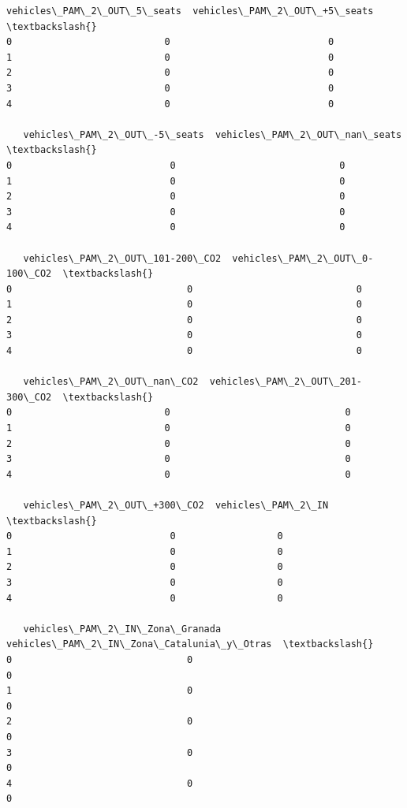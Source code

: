 \documentclass[11pt]{article}
\begin{document}
\begin{tcolorbox}[breakable, size=fbox, boxrule=.5pt, pad at break*=1mm, opacityfill=0]
\begin{Verbatim}[commandchars=\\\{\}]
   vehicles\_PAM\_2\_OUT\_5\_seats  vehicles\_PAM\_2\_OUT\_+5\_seats  \textbackslash{}
0                           0                            0
1                           0                            0
2                           0                            0
3                           0                            0
4                           0                            0

   vehicles\_PAM\_2\_OUT\_-5\_seats  vehicles\_PAM\_2\_OUT\_nan\_seats  \textbackslash{}
0                            0                             0
1                            0                             0
2                            0                             0
3                            0                             0
4                            0                             0

   vehicles\_PAM\_2\_OUT\_101-200\_CO2  vehicles\_PAM\_2\_OUT\_0-100\_CO2  \textbackslash{}
0                               0                             0
1                               0                             0
2                               0                             0
3                               0                             0
4                               0                             0

   vehicles\_PAM\_2\_OUT\_nan\_CO2  vehicles\_PAM\_2\_OUT\_201-300\_CO2  \textbackslash{}
0                           0                               0
1                           0                               0
2                           0                               0
3                           0                               0
4                           0                               0

   vehicles\_PAM\_2\_OUT\_+300\_CO2  vehicles\_PAM\_2\_IN  \textbackslash{}
0                            0                  0
1                            0                  0
2                            0                  0
3                            0                  0
4                            0                  0

   vehicles\_PAM\_2\_IN\_Zona\_Granada  vehicles\_PAM\_2\_IN\_Zona\_Catalunia\_y\_Otras  \textbackslash{}
0                               0                                         0
1                               0                                         0
2                               0                                         0
3                               0                                         0
4                               0                                         0


\end{Verbatim}
\end{tcolorbox}
\end{document}
